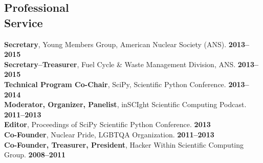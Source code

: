 \documentclass[margin,line]{resume}
\begin{document}
\begin{resume}
    \section{\mysidestyle Professional\\Service}
		\textbf{Secretary}, Young Members Group, American Nuclear Society (ANS). \hfill \textbf{2013--2015}\vspace{.5mm}\\%
		\textbf{Secretary--Treasurer}, Fuel Cycle \& Waste Management Division, ANS. \hfill \textbf{2013--2015}\vspace{.5mm}\\%
		\textbf{Technical Program Co-Chair}, SciPy, Scientific Python Conference.  \hfill \textbf{2013--2014}\vspace{.5mm}\\%
		\textbf{Moderator, Organizer, Panelist}, inSCIght Scientific Computing Podcast. \hfill \textbf{2011--2013}\vspace{.5mm}\\%
		\textbf{Editor}, Proceedings of SciPy Scientific Python Conference.  \hfill \textbf{2013}\vspace{.5mm}\\%
		\textbf{Co-Founder}, Nuclear Pride, LGBTQA Organization. \hfill \textbf{2011--2013}\vspace{.5mm}\\%
		\textbf{Co-Founder, Treasurer, President}, Hacker Within Scientific Computing Group. \hfill \textbf{2008--2011}\vspace{.5mm}\\%
%   
%  
%  
%  
%  
%  
%  
\end{resume}
\end{document}
